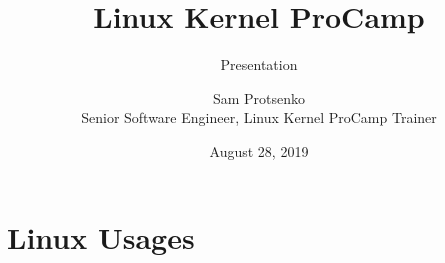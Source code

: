 

\title{Linux Kernel ProCamp}
\subtitle{Presentation}
\author{Sam Protsenko \texorpdfstring{\\ Senior Software Engineer, Linux Kernel ProCamp Trainer}{}}
\date{\vspace*{5mm}August 28, 2019}



\maketitle


\section{Linux Usages}

